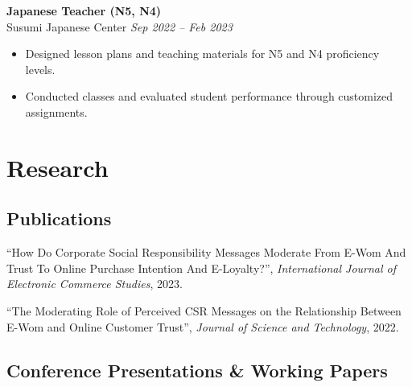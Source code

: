 \documentclass[10.5pt]{article}
\begin{document}
\textbf{Japanese Teacher (N5, N4)} \hfill \\
Susumi Japanese Center \hfill \emph{Sep 2022 -- Feb 2023}
\vspace{-0.5em}
\begin{itemize}
\item Designed lesson plans and teaching materials for N5 and N4 proficiency levels.
\item Conducted classes and evaluated student performance through customized assignments.
\end{itemize}


\section{Research}

\subsection{Publications}

\begin{enumerate}[label={[\arabic*]}]

\item ``How Do Corporate Social Responsibility Messages Moderate From E-Wom And Trust To Online Purchase Intention And E-Loyalty?'', \textit{International Journal of Electronic Commerce Studies}, 2023.

\item ``The Moderating Role of Perceived CSR Messages on the Relationship Between E-Wom and Online Customer Trust'', \textit{Journal of Science and Technology}, 2022.

\end{enumerate}

\subsection{Conference Presentations \& Working Papers}
\end{document}
